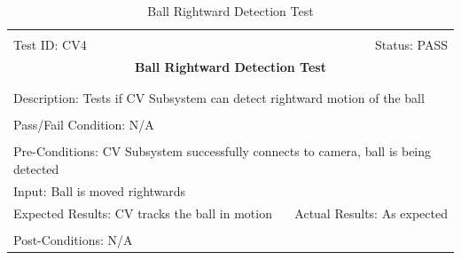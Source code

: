 \documentclass[11pt]{article}
\begin{document}
\begin{center}
\begin{table}[H]
\begin{tabular}{|l r|}\hline&\\[-2mm]
	Test ID: CV4	&Status: PASS\\[-3mm]
	\multicolumn{2}{|c|}{\textbf{\large{Ball Rightward Detection Test}}}\\&\\\hline&\\[-3mm]
	\multicolumn{2}{|p{\textwidth}|}{Description: Tests if CV Subsystem can detect rightward motion of the ball}\\[1mm]\hline&\\[-3mm]
	\multicolumn{2}{|p{\textwidth}|}{Pass/Fail Condition: N/A }\\[1mm]\hline&\\[-3mm]
	\multicolumn{2}{|p{\textwidth}|}{Pre-Conditions: CV Subsystem successfully connects to camera, ball is being detected}\\[4mm]
	\multicolumn{2}{|p{\textwidth}|}{Input: Ball is moved rightwards}\\[2mm]\hline
	\multicolumn{1}{|p{0.49\textwidth}}{Expected Results: CV tracks the ball in motion}	&\multicolumn{1}{|p{0.45\textwidth}|}{Actual Results: As expected}\\\hline&\\[-3mm]
	\multicolumn{2}{|p{\textwidth}|}{Post-Conditions: N/A}\\\hline
\end{tabular}
\caption{Ball Rightward Detection Test}
\end{table}
\end{center}
\end{document}
